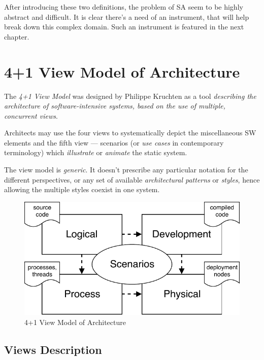\documentclass[thesis=M,english,hidelinks]{FITthesis}[2012/10/20]
\begin{document}
After introducing these two definitions, the problem of \acrshort{SA} seem to be highly abstract and difficult. It is clear there's a need of an instrument, that will help break down this complex domain. Such an instrument is featured in the next chapter.

% 
% 
\section{4+1 View Model of Architecture}
The \textit{4+1 View Model} was designed by Philippe Kruchten as a tool \textit{describing the architecture of software-intensive systems, based on the use of multiple, concurrent views}.~\cite{arch-41-views}

Architects may use the four views to systematically depict the miscellaneous \acrshort{SW} elements and the fifth view --- scenarios (or \textit{use cases} in contemporary terminology) which \textit{illustrate} or \textit{animate} the static system.

The view model is \textit{generic}. It doesn't prescribe any particular notation for the different perspectives, or any set of available \textit{architectural patterns} or \textit{styles}, hence allowing the multiple styles coexist in one system.

\begin{figure}
  \centering
    \includegraphics{images/4+1_view.pdf}
    \caption{4+1 View Model of Architecture}
    \label{fig:arch-41-view}
\end{figure}

\subsection{Views Description}
\label{sec:41-views-description}
\end{document}
